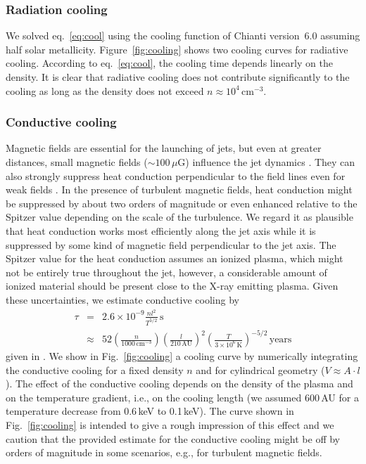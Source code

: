 \subsubsection{Radiation cooling}
We solved eq.~\ref{eq:cool} using the cooling function of Chianti version~6.0 \citep{Dere_1997,Dere_2009} assuming half solar metallicity.
Figure~\ref{fig:cooling} shows two cooling curves for radiative cooling. According to eq.~\ref{eq:cool}, the cooling time depends linearly on the density. It is clear that radiative cooling does not contribute significantly to the cooling as long as the density does not exceed $n\approx10^4\,$cm$^{-3}$.

\subsubsection{Conductive cooling}
Magnetic fields are essential for the launching of jets, but even at greater distances, small magnetic fields ($\sim 100\,\mu$G) influence the jet dynamics \citep[][]{Hartigan_2007}. They can also strongly suppress heat conduction perpendicular to the field lines even for weak fields \citep[$\sim 1\mu\;$G, see eq. 5-53 in ][]{Spitzer_1962}. In the presence of turbulent magnetic fields, heat conduction might be suppressed by about two orders of magnitude or even enhanced relative to the Spitzer value \citep[e.g.][]{Narayan_2001,Cho_2003,Lazarian_2006} depending on the scale of the turbulence. We regard it as plausible that heat conduction works most efficiently along the jet axis while it is suppressed by some kind of magnetic field
perpendicular to the jet axis. The Spitzer value for the heat conduction assumes an ionized plasma, which might not be entirely true throughout the jet, however, a considerable amount of ionized material should be present close to the X-ray emitting plasma.
Given these uncertainties, we estimate conductive cooling by
\begin{eqnarray}
\tau&=&2.6\times10^{-9}\frac{n l^2}{T^{5/2}} \,\mbox{s}\\
    &\approx& 52 \left(\frac{n}{1000\,\mbox{cm}^{-3}}\right) \left(\frac{l}{210\,\mbox{AU}}\right)^2 \left( \frac{T}{3\times10^6\,\mbox{K}}\right)^{-5/2}\,\mbox{years}
\end{eqnarray}
given in \citet{Orlando_2005}. We show in Fig.~\ref{fig:cooling} a cooling curve by numerically integrating the conductive cooling for a fixed density $n$ and for
cylindrical geometry ($V\approx A\cdot l$).
The effect of the conductive cooling depends on the density of the plasma and on the temperature gradient, i.e., on the cooling length (we assumed 600\,AU for a temperature decrease from 0.6\,keV to 0.1\,keV). The curve shown in Fig.~\ref{fig:cooling} is intended to give a rough impression of this effect and we caution that the provided estimate for the conductive cooling might be off by orders of magnitude in some scenarios, e.g., for turbulent magnetic fields.


